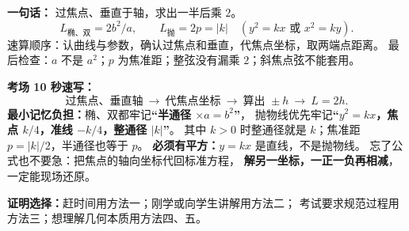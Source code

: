 \begin{summarybox}
\textbf{一句话：} 过焦点、垂直于轴，求出一半后乘 $2$。
\[
 L_{\text{椭、双}}=2b^2/a,\qquad
 L_{\text{抛}}=2p=|k|\quad(y^2=kx\text{ 或 }x^2=ky).
\]
速算顺序：认曲线与参数，确认过焦点和垂直，代焦点坐标，取两端点距离。
最后检查：$a$ 不是 $a^2$；$p$ 为焦准距；整弦没有漏乘 $2$；斜焦点弦不能套用。


\medskip
\textbf{考场 10 秒速写：}
\[
\boxed{\text{过焦点、垂直轴}}
\ \longrightarrow\
\boxed{\text{代焦点坐标}}
\ \longrightarrow\
\boxed{\text{算出 }\pm h}
\ \longrightarrow\
\boxed{L=2h}.
\]
\textbf{最小记忆负担：}椭、双都牢记\textbf{“半通径 $\times a=b^2$”}，
抛物线优先牢记\textbf{“$y^2=kx$，焦点 $k/4$，准线 $-k/4$，整通径 $|k|$”}。
其中 $k>0$ 时整通径就是 $k$；焦准距 $p=|k|/2$，半通径也等于 $p$。
\textbf{必须有平方：}$y=kx$ 是直线，不是抛物线。
忘了公式也不要急：把焦点的轴向坐标代回标准方程，
\textbf{解另一坐标，一正一负再相减}，一定能现场还原。

\textbf{证明选择：}赶时间用方法一；刚学或向学生讲解用方法二；
考试要求规范过程用方法三；想理解几何本质用方法四、五。

\end{summarybox}
